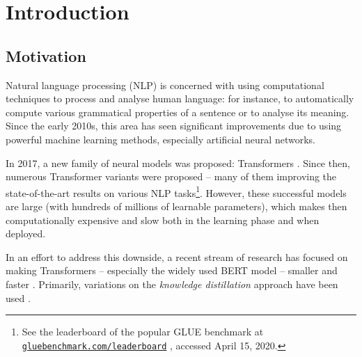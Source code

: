 \documentclass[bsc,frontabs,twoside,singlespacing,parskip,deptreport]{infthesis}
\newcommand\rurl[1]{%
  \href{https://#1}{\nolinkurl{#1}}%
}
\begin{document}
\chapter{Introduction}{
  \section{Motivation}{
  Natural language processing (NLP) is concerned with using computational techniques to process and analyse human language: for instance, to automatically compute various grammatical properties of a sentence or to analyse its meaning.
  Since the early 2010s, this area has seen significant improvements due to using powerful machine learning methods, especially artificial neural networks.

  In 2017, a new family of neural models was proposed: Transformers \citep{Vaswani_2017}. Since then, numerous Transformer variants were proposed \citep{Radford_2018,Devlin_2018,Lan_2019,Liu_2019,Lample_2019} -- many of them improving the state-of-the-art results on various NLP tasks\footnote{See the leaderboard of the popular GLUE benchmark \citep{Wang_2018} at \rurl{gluebenchmark.com/leaderboard}, accessed April 15, 2020.}.
  However, these successful models are large (with hundreds of millions of learnable parameters), which makes then computationally expensive and slow both in the learning phase and when deployed.

  In an effort to address this downside, a recent stream of research has focused on making Transformers -- especially the widely used BERT model \citep{Devlin_2018} -- smaller and faster \citep{Michel_2019,Cheong_2019}.
  Primarily, variations on the \textit{knowledge distillation} approach \citep{Bucila_2006} have been used \citep{Sun_2019a,Mukherjee_2019,Tang_2019a,Tang_2019b,Jiao_2019,Sanh_2019}.
      
}}
\end{document}

